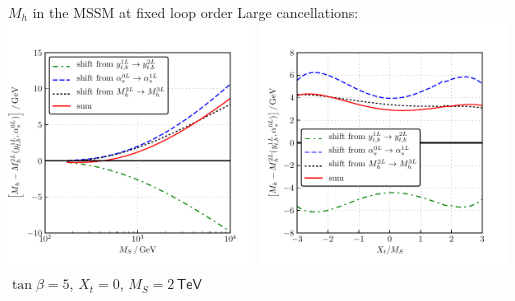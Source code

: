 \documentclass[hyperref={pdfpagelabels=false},ngerman]{beamer}
\newcommand{\eh}[1]{\,\mathsf{#1}}
\newcommand{\MS}{\ensuremath{M_S}}
\begin{document}
\begin{frame}{$M_h$ in the MSSM at fixed loop order}
  Large cancellations:\\
  \includegraphics[width=0.49\textwidth]{plots/Mh3L/scan_Mh_MS_TB-5_Xt-0_contributions}\hfill
  \includegraphics[width=0.49\textwidth]{plots/Mh3L/scan_Mh_Xt_TB-5_MS-2000_contributions}\\
  $\tan\beta=5$, $X_t=0$, $\MS = 2\eh{TeV}$
\end{frame}
\end{document}
